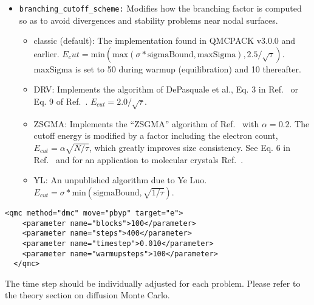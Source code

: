 \begin{itemize}


\item \texttt{branching\_cutoff\_scheme:} Modifies how the branching factor is computed so as to avoid divergences and stability
problems near nodal surfaces. 
\begin{itemize}
  \item classic (default): The implementation found in QMCPACK v3.0.0 and earlier.
  $E_cut=\mathrm{min}(\mathrm{max}(\sigma * \mathrm{sigmaBound},\mathrm{maxSigma}),2.5/\sqrt{\tau})$. $\mathrm{maxSigma}$ is set to
  50 during warmup (equilibration) and 10 thereafter.
  \item DRV: Implements the algorithm of DePasquale et al., Eq. 3 in Ref.~\cite{DePasqualeReliable1988} or Eq. 9 of Ref.~\cite{Umrigar1993}.
  $E_{cut}=2.0/\sqrt{\tau}$.
  \item ZSGMA: Implements the ``ZSGMA'' algorithm of Ref.~\cite{ZenBoosting2016} with $\alpha=0.2$. The cutoff energy is modified by a factor including the
  electron count, $E_{cut}=\alpha \sqrt{N/\tau}$, which greatly improves size consistency. See Eq. 6 in Ref.~\cite{ZenBoosting2016} and for
  an application to molecular crystals Ref.~\cite{ZenFast2018}.
  \item YL: An unpublished algorithm due to Ye Luo. $E_{cut}=\sigma*\mathrm{min}(\mathrm{sigmaBound},\sqrt{1/\tau})$.
\end{itemize}

\end{itemize}

\begin{lstlisting}[style=QMCPXML,caption=The following is an example of a very simple DMC section. ]
  <qmc method="dmc" move="pbyp" target="e">
    <parameter name="blocks">100</parameter>
    <parameter name="steps">400</parameter>
    <parameter name="timestep">0.010</parameter>
    <parameter name="warmupsteps">100</parameter>
  </qmc>
\end{lstlisting}
The time step should be individually adjusted for each problem.  Please refer to the theory section
on diffusion Monte Carlo.


